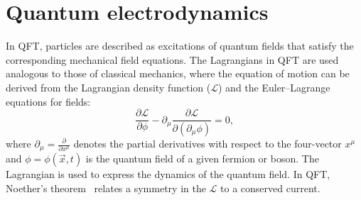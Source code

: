 \section{Quantum electrodynamics}
\label{sec:chap1:QED}

In QFT, particles are described as excitations of quantum fields that satisfy the corresponding mechanical field equations.
The Lagrangians in QFT are used analogous to those of classical mechanics, where the equation of motion can be derived from the Lagrangian density
function ($\mathcal{L}$) and the Euler--Lagrange equations for fields:
\begin{equation*}
\frac{\partial\mathcal{L}}{\partial \phi} - \partial_{\mu} \frac{\partial\mathcal{L}}{\partial (\partial_{\mu} \phi)} = 0 ,
\end{equation*}
where  $\partial_{\mu} = \frac{\partial}{\partial x^{\mu}}$ denotes the partial derivatives with respect to the four-vector $x^{\mu}$ and 
$\phi = \phi(\overrightarrow{x},t)$ is the quantum field of a given fermion or boson. %
The Lagrangian is used to express the dynamics of the quantum field. In QFT, Noether's theorem~\cite{Noether1918}
relates a symmetry in the $\mathcal{L}$ to a conserved current. %

